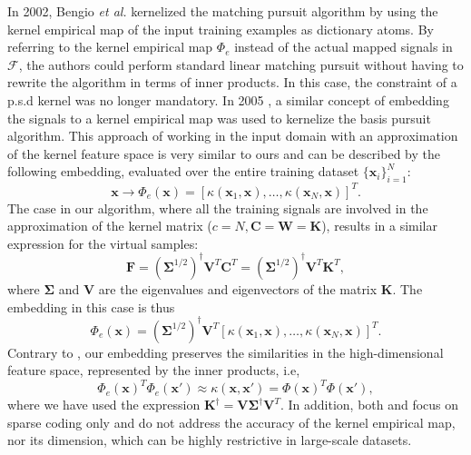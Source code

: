 \documentclass[journal]{IEEEtran}
\newcommand{\bx}{\mathbf{x}}
\newcommand{\cF}{\mathcal{F}}
\newcommand{\bK}{\mathbf{K}}
\newcommand{\bF}{\mathbf{F}}
\newcommand{\bC}{\mathbf{C}}
\newcommand{\bW}{\mathbf{W}}
\newcommand{\bV}{\mathbf{V}}
\begin{document}
In 2002, Bengio \textit{et al.} \cite{KMP} kernelized the matching pursuit algorithm by using the kernel empirical map of the input training examples as dictionary atoms. By referring to the kernel empirical map $\Phi_e$ instead of the actual mapped signals in $\cF$, the authors could perform standard linear matching pursuit without having to rewrite the algorithm in terms of inner products. In this case, the constraint of a p.s.d kernel was no longer mandatory. In 2005 \cite{KBP}, a similar concept of embedding the signals to a kernel empirical map was used to kernelize the basis pursuit algorithm. This approach of working in the input domain with an approximation of the kernel feature space is very similar to ours and can be described by the following embedding, evaluated over the entire training dataset $\{\bx_i\}_{i=1}^N$:
\begin{equation}\label{eq:kernelEmpiricalMap}
\bx \rightarrow \Phi_e(\bx) = \left[\kappa(\bx_1,\bx),\ldots,\kappa(\bx_N,\bx)\right]^T.
\end{equation}
The case in our algorithm, where all the training signals are involved in the approximation of the kernel matrix ($c=N,\bC=\bW=\bK$), results in a similar expression for the virtual samples:
\begin{equation}\label{eq:FullVirtaulSamples}
\bF=(\boldsymbol{\Sigma}^{1/2})^{\dagger} \bV^T \bC^T=(\boldsymbol{\Sigma}^{1/2})^{\dagger} \bV^T \bK^T,
\end{equation}
where $\boldsymbol{\Sigma}$ and $\bV$ are the eigenvalues and eigenvectors of the matrix $\bK$.
The embedding in this case is thus
\begin{equation}\label{eq:kernelEmpiricalMap2}
\Phi_e(\bx) = (\boldsymbol{\Sigma}^{1/2})^{\dagger} \bV^T \left[\kappa(\bx_1,\bx),\ldots,\kappa(\bx_N,\bx)\right]^T.
\end{equation}
Contrary to \cite{KMP,KBP}, our embedding preserves the similarities in the high-dimensional feature space, represented by the inner products, i.e,
\begin{equation}\label{eq:preserveInnerProduct}
\Phi_e(\bx)^T\Phi_e(\bx') \approx \kappa(\bx,\bx')=\Phi(\bx)^T\Phi(\bx'),
\end{equation}
where we have used the expression $\bK^{\dagger}=\bV \boldsymbol{\Sigma}^{\dagger} \bV^T$. In addition, both \cite{KMP} and \cite{KBP} focus on sparse coding only and do not address the accuracy of the kernel empirical map, nor its dimension, which can be highly restrictive in large-scale datasets.
\end{document}
